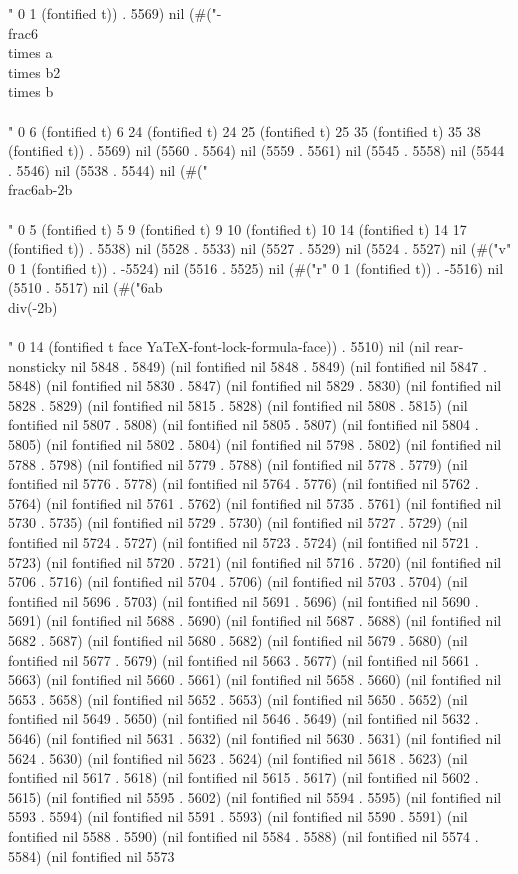 {" 0 1 (fontified t)) . 5569) nil (#("-\\frac{6\\times a\\times b}{2\\times b}\\\\" 0 6 (fontified t) 6 24 (fontified t) 24 25 (fontified t) 25 35 (fontified t) 35 38 (fontified t)) . 5569) nil (5560 . 5564) nil (5559 . 5561) nil (5545 . 5558) nil (5544 . 5546) nil (5538 . 5544) nil (#("\\frac{6ab}{-2b}\\\\" 0 5 (fontified t) 5 9 (fontified t) 9 10 (fontified t) 10 14 (fontified t) 14 17 (fontified t)) . 5538) nil (5528 . 5533) nil (5527 . 5529) nil (5524 . 5527) nil (#("v" 0 1 (fontified t)) . -5524) nil (5516 . 5525) nil (#("r" 0 1 (fontified t)) . -5516) nil (5510 . 5517) nil (#("6ab\\div(-2b)\\\\" 0 14 (fontified t face YaTeX-font-lock-formula-face)) . 5510) nil (nil rear-nonsticky nil 5848 . 5849) (nil fontified nil 5848 . 5849) (nil fontified nil 5847 . 5848) (nil fontified nil 5830 . 5847) (nil fontified nil 5829 . 5830) (nil fontified nil 5828 . 5829) (nil fontified nil 5815 . 5828) (nil fontified nil 5808 . 5815) (nil fontified nil 5807 . 5808) (nil fontified nil 5805 . 5807) (nil fontified nil 5804 . 5805) (nil fontified nil 5802 . 5804) (nil fontified nil 5798 . 5802) (nil fontified nil 5788 . 5798) (nil fontified nil 5779 . 5788) (nil fontified nil 5778 . 5779) (nil fontified nil 5776 . 5778) (nil fontified nil 5764 . 5776) (nil fontified nil 5762 . 5764) (nil fontified nil 5761 . 5762) (nil fontified nil 5735 . 5761) (nil fontified nil 5730 . 5735) (nil fontified nil 5729 . 5730) (nil fontified nil 5727 . 5729) (nil fontified nil 5724 . 5727) (nil fontified nil 5723 . 5724) (nil fontified nil 5721 . 5723) (nil fontified nil 5720 . 5721) (nil fontified nil 5716 . 5720) (nil fontified nil 5706 . 5716) (nil fontified nil 5704 . 5706) (nil fontified nil 5703 . 5704) (nil fontified nil 5696 . 5703) (nil fontified nil 5691 . 5696) (nil fontified nil 5690 . 5691) (nil fontified nil 5688 . 5690) (nil fontified nil 5687 . 5688) (nil fontified nil 5682 . 5687) (nil fontified nil 5680 . 5682) (nil fontified nil 5679 . 5680) (nil fontified nil 5677 . 5679) (nil fontified nil 5663 . 5677) (nil fontified nil 5661 . 5663) (nil fontified nil 5660 . 5661) (nil fontified nil 5658 . 5660) (nil fontified nil 5653 . 5658) (nil fontified nil 5652 . 5653) (nil fontified nil 5650 . 5652) (nil fontified nil 5649 . 5650) (nil fontified nil 5646 . 5649) (nil fontified nil 5632 . 5646) (nil fontified nil 5631 . 5632) (nil fontified nil 5630 . 5631) (nil fontified nil 5624 . 5630) (nil fontified nil 5623 . 5624) (nil fontified nil 5618 . 5623) (nil fontified nil 5617 . 5618) (nil fontified nil 5615 . 5617) (nil fontified nil 5602 . 5615) (nil fontified nil 5595 . 5602) (nil fontified nil 5594 . 5595) (nil fontified nil 5593 . 5594) (nil fontified nil 5591 . 5593) (nil fontified nil 5590 . 5591) (nil fontified nil 5588 . 5590) (nil fontified nil 5584 . 5588) (nil fontified nil 5574 . 5584) (nil fontified nil 5573 }
